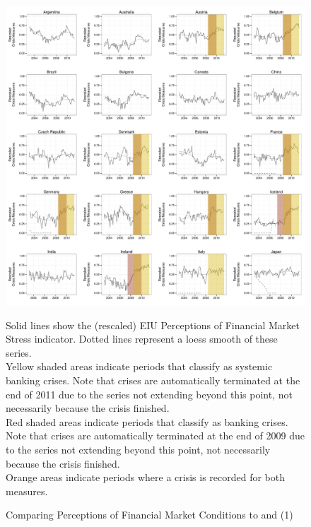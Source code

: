 \documentclass[]{article}
\begin{document}
\begin{figure}
    \caption{Comparing Perceptions of Financial Market Conditions to \cite{laeven2013} and \cite{Reinhart2009} (1)}
    \label{compare_1}
    \begin{center}
        \includegraphics[scale=0.4]{analysis/figures/compare_to_lv_rr.pdf}
    \end{center}

    {\tiny{Solid lines show the (rescaled) EIU Perceptions of Financial Market Stress indicator. Dotted lines represent a loess smooth of these series. \\

    Yellow shaded areas indicate periods that \cite{laeven2013} classify as systemic banking crises. Note that crises are automatically terminated at the end of 2011 due to the series not extending beyond this point, not necessarily because the crisis finished. \\

    Red shaded areas indicate periods that \cite{Reinhart2009} classify as banking crises. Note that crises are automatically terminated at the end of 2009 due to the series not extending beyond this point, not necessarily because the crisis finished. \\

    Orange areas indicate periods where a crisis is recorded for both measures.}}
\end{figure}
\end{document}
